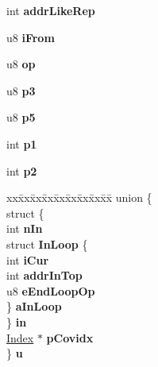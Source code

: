 \begin{DoxyCompactItemize}
\item 
int {\bfseries addr\+Like\+Rep}\hypertarget{structWhereLevel_a903c5abe2bf15929b51a1d0921782531}{}\label{structWhereLevel_a903c5abe2bf15929b51a1d0921782531}

\item 
u8 {\bfseries i\+From}\hypertarget{structWhereLevel_a4d8e905640b12a5075ff5e2f395876dd}{}\label{structWhereLevel_a4d8e905640b12a5075ff5e2f395876dd}

\item 
u8 {\bfseries op}\hypertarget{structWhereLevel_a0253c213b81cd17481601e495d421706}{}\label{structWhereLevel_a0253c213b81cd17481601e495d421706}

\item 
u8 {\bfseries p3}\hypertarget{structWhereLevel_a350b6471be36b98926c357c75658865f}{}\label{structWhereLevel_a350b6471be36b98926c357c75658865f}

\item 
u8 {\bfseries p5}\hypertarget{structWhereLevel_a568ee11c7ecabb4259836ccc11025ae6}{}\label{structWhereLevel_a568ee11c7ecabb4259836ccc11025ae6}

\item 
int {\bfseries p1}\hypertarget{structWhereLevel_ad544492b3388cb82a4b3674e6c1fdb07}{}\label{structWhereLevel_ad544492b3388cb82a4b3674e6c1fdb07}

\item 
int {\bfseries p2}\hypertarget{structWhereLevel_a9c60432a75f2252764e78128e4dad19b}{}\label{structWhereLevel_a9c60432a75f2252764e78128e4dad19b}

\item 
\begin{tabbing}
xx\=xx\=xx\=xx\=xx\=xx\=xx\=xx\=xx\=\kill
union \{\\
\>struct \{\\
\>\>int {\bfseries nIn}\\
\>\>struct {\bfseries InLoop} \{\\
\>\>\>int {\bfseries iCur}\\
\>\>\>int {\bfseries addrInTop}\\
\>\>\>u8 {\bfseries eEndLoopOp}\\
\>\>\} {\bfseries aInLoop}\\
\>\} {\bfseries in}\\
\>\hyperlink{structIndex}{Index} $\ast$ {\bfseries pCovidx}\\
\} {\bfseries u}\hypertarget{structWhereLevel_abad390f24feceb6cf35799d658ab68e4}{}\label{structWhereLevel_abad390f24feceb6cf35799d658ab68e4}
\\


\end{tabbing}
\end{DoxyCompactItemize}
